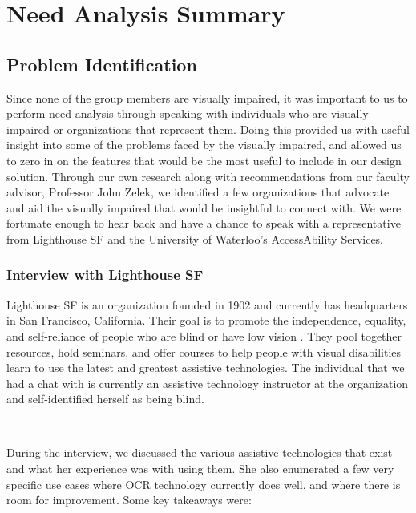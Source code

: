 \documentclass[a4paper,11pt]{article}
\begin{document}
\newpage
\section{Need Analysis Summary}
\label{need-analysis-summary}

\subsection{Problem Identification}
Since none of the group members are visually impaired, it was important to us to perform need analysis through speaking with individuals who are visually impaired or organizations that represent them. Doing this provided us with useful insight into some of the problems faced by the visually impaired, and allowed us to zero in on the features that would be the most useful to include in our design solution. Through our own research along with recommendations from our faculty advisor, Professor John Zelek, we identified a few organizations that advocate and aid the visually impaired that would be insightful to connect with. We were fortunate enough to hear back and have a chance to speak with a representative from Lighthouse SF and the University of Waterloo's AccessAbility Services.

\subsubsection{Interview with Lighthouse SF}
Lighthouse SF is an organization founded in 1902 and currently has headquarters in San Francisco, California. Their goal is to promote the independence, equality, and self-reliance of people who are blind or have low vision \cite{lighthouse-sf-homepage}. They pool together resources, hold seminars, and offer courses to help people with visual disabilities learn to use the latest and greatest assistive technologies. The individual that we had a chat with is currently an assistive technology instructor at the organization and self-identified herself as being blind.

\

\noindent
During the interview, we discussed the various assistive technologies that exist and what her experience was with using them. She also enumerated a few very specific use cases where OCR technology currently does well, and where there is room for improvement. Some key takeaways were:
\end{document}
